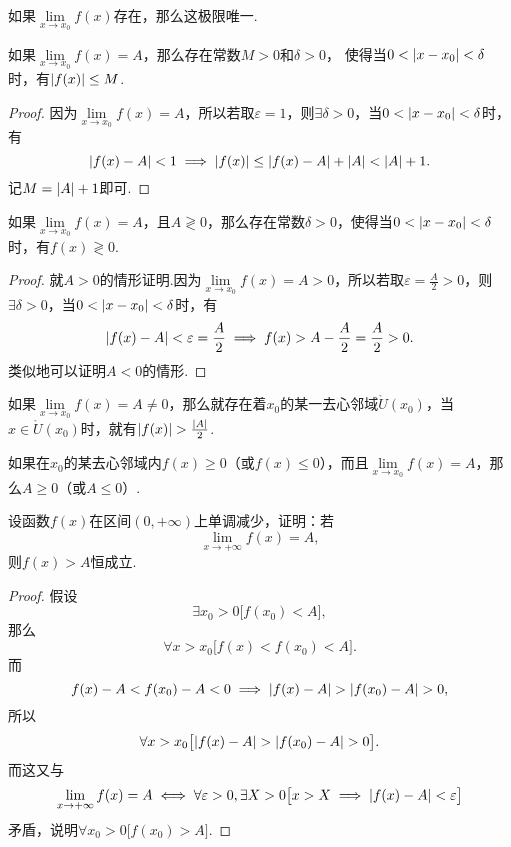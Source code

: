 \begin{theorem}[函数极限的唯一性]\label{theorem:极限.函数极限的唯一性}
如果\(\lim\limits_{x \to x_0}f(x)\)存在，那么这极限唯一.
\end{theorem}

\begin{theorem}[函数极限的局部有界性]\label{theorem:极限.函数极限的局部有界性}
如果\(\lim\limits_{x \to x_0}f(x) = A\)，那么存在常数\(M>0\)和\(\delta>0\)，
使得当\(0<\abs{x-x_0}<\delta\)时，有\(\abs{f(x)} \leq M\).
\begin{proof}
因为\(\lim\limits_{x \to x_0}f(x) = A\)，所以若取\(\varepsilon = 1\)，则\(\exists \delta > 0\)，当\(0 < \abs{x - x_0} < \delta\)时，有\[
\abs{f(x) - A} < 1 \implies \abs{f(x)} \leq \abs{f(x) - A} + \abs{A} < \abs{A} + 1.
\]记\(M = \abs{A} + 1\)即可.
\end{proof}
\end{theorem}

\begin{theorem}[函数极限的局部保号性]\label{theorem:极限.函数极限的局部保号性1}
如果\(\lim\limits_{x \to x_0}f(x)=A\)，且\(A \gtrless 0\)，那么存在常数\(\delta>0\)，使得当\(0<\abs{x-x_0}<\delta\)时，有\(f(x) \gtrless 0\).
\begin{proof}
就\(A > 0\)的情形证明.因为\(\lim\limits_{x \to x_0}f(x) = A > 0\)，所以若取\(\varepsilon = \frac{A}{2} > 0\)，则\(\exists \delta > 0\)，当\(0 < \abs{x - x_0} < \delta\)时，有\[
\abs{f(x) - A} < \varepsilon = \frac{A}{2}
\implies f(x) > A - \frac{A}{2} = \frac{A}{2} > 0.
\]类似地可以证明\(A < 0\)的情形.
\end{proof}
\end{theorem}

\begin{theorem}\label{theorem:极限.函数极限的局部保号性2}
如果\(\lim\limits_{x \to x_0}f(x) = A \neq 0\)，那么就存在着\(x_0\)的某一去心邻域\(\mathring{U}(x_0)\)，当\(x\in\mathring{U}(x_0)\)时，就有\(\abs{f(x)}>\frac{\abs{A}}{2}\).
\end{theorem}

\begin{corollary}\label{theorem:极限.函数极限的局部保号性3}
如果在\(x_0\)的某去心邻域内\(f(x) \geq 0\)（或\(f(x) \leq 0\)），而且\(\lim\limits_{x \to x_0}f(x) = A\)，那么\(A \geq 0\)（或\(A \leq 0\)）.
\end{corollary}

\begin{example}
设函数\(f(x)\)在区间\((0,+\infty)\)上单调减少，证明：若\[
\lim\limits_{x\to+\infty}f(x)=A,
\]则\(f(x)>A\)恒成立.
\begin{proof}
假设\[
\exists x_0 > 0 \bigl[
	f(x_0) < A
\bigr],
\]那么\[
\forall x > x_0 \bigl[
	f(x) < f(x_0) < A
\bigr].
\]而\[
f(x) - A < f(x_0) - A < 0
\implies
\abs{f(x) - A} > \abs{f(x_0) - A} > 0,
\]所以\[
\forall x > x_0 \bigl[
	\abs{f(x) - A} > \abs{f(x_0) - A} > 0
\bigr].
\]而这又与\[
\lim\limits_{x\to+\infty}f(x)=A
\iff
\forall \varepsilon > 0, \exists X > 0 \bigl[
	x > X \implies \abs{f(x) - A} < \varepsilon
\bigr]
\]矛盾，说明\(\forall x_0 > 0 \bigl[
	f(x_0) > A
\bigr]\).
\end{proof}
\end{example}

